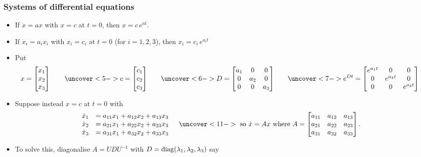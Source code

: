 \documentclass[9pt]{beamer}
\begin{document}
\begin{frame}[t]
 \frametitle{Systems of differential equations}
 \begin{itemize}
  \item<2-> If $\dot{x}=ax$ with $x=c$ at $t=0$, then $x=c\,e^{at}$.
  \item<3-> If $\dot{x}_i=a_ix_i$ with $x_i=c_i$ at $t=0$ (for $i=1,2,3$),
   then $x_i=c_i\,e^{a_it}$
  \item<4-> Put 
   \[ x = \bbm x_1 \\ x_2 \\ x_3 \ebm \qquad
      \uc<5->{c = \bbm c_1 \\ c_2 \\ c_3 \ebm \qquad}
      \uc<6->{D = \bbm a_1 &   0 &   0 \\
                         0 & a_2 &   0 \\
                         0 &   0 & a_3 \ebm} \qquad
      \uc<7->{e^{Dt} = \bbm e^{a_1t} & 0 & 0 \\
                            0 & e^{a_2t} & 0 \\
                            0 & 0 & e^{a_3t} \ebm}
   \] 
  \item<10-> Suppose instead $x=c$ at $t=0$ with
   \[ \begin{array}{rl}
       \dot{x}_1 &= a_{11}x_1 + a_{12}x_2 + a_{13}x_3 \\
       \dot{x}_2 &= a_{21}x_1 + a_{22}x_2 + a_{23}x_3 \\
       \dot{x}_3 &= a_{31}x_1 + a_{32}x_2 + a_{33}x_3
      \end{array}
      \hspace{1em}
      \uc<11->{\text{ so } \dot{x} = Ax \text{ where }
       A = \bbm 
        a_{11} & a_{12} & a_{13} \\
        a_{21} & a_{22} & a_{23} \\
        a_{31} & a_{32} & a_{33}
       \ebm.}
   \]
  \item<12-> To solve this, diagonalise $A=UDU^{-1}$ with
   $D=\operatorname{diag}(\lambda_1,\lambda_2,\lambda_3)$ say
 \end{itemize}
\end{frame}  
\end{document}
